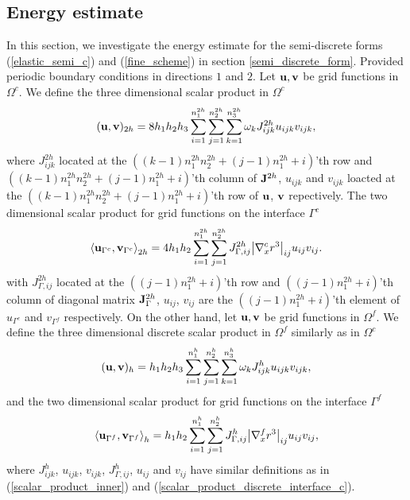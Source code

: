 \subsection{Energy estimate}
In this section, we investigate the energy estimate for the semi-discrete forms (\ref{elastic_semi_c}) and (\ref{fine_scheme}) in section \ref{semi_discrete_form}. Provided periodic boundary conditions in directions $1$ and $2$. Let ${\bf u}, {\bf v}$ be grid functions in $\Omega^c$. We define the three dimensional scalar product in $\Omega^c$
\begin{equation}\label{scalar_product_inner}
({\bf u}, {\bf v})_{2h} = 8h_1h_2h_3\sum_{i=1}^{n_1^{2h}}\sum_{j=1}^{n_2^{2h}}\sum_{k=1}^{n_3^{2h}}\omega_k{J}_{ijk}^{2h}u_{ijk}v_{ijk},
\end{equation}
where $J^{2h}_{ijk}$ located at the $((k-1)n_1^{2h}n_2^{2h}+(j-1)n_1^{2h}+i)$'th row and $((k-1)n_1^{2h}n_2^{2h}+(j-1)n_1^{2h}+i)$'th column of ${\bf J}^{2h}$, $u_{ijk}$ and $v_{ijk}$ loacted at the $((k-1)n_1^{2h}n_2^{2h}+(j-1)n_1^{2h}+i)$'th row of ${\bf u}$, ${\bf v}$ repectively. The two dimensional scalar product for grid functions on the interface $\Gamma^c$
\begin{equation}\label{scalar_product_discrete_interface_c}
\left<{\bf u}_{\Gamma^c}, {\bf v}_{\Gamma^c}\right>_{2h} = 4h_1h_2\sum_{i=1}^{n_1^{2h}}\sum_{j=1}^{n_2^{2h}}{ J}_{\Gamma,ij}^{2h}\big|\nabla_x^c r^{3}\big|_{ij}u_{ij}v_{ij}.
\end{equation}
with $J^{2h}_{\Gamma,ij}$ located at the $((j-1)n_1^{2h}+i)$'th row and $((j-1)n_1^{2h}+i)$'th column of diagonal matrix ${\bf J}_{\Gamma}^{2h}$, $u_{ij}$, $v_{ij}$ are the $((j-1)n_1^{2h}+i)$'th element of $u_{\Gamma^c}$ and $v_{\Gamma^f}$ respectively. On the other hand, let ${\bf u}, {\bf v}$ be grid functions in $\Omega^f$. We define the three dimensional discrete scalar product in $\Omega^f$ similarly as in $\Omega^c$
\begin{equation*}
({\bf u}, {\bf v})_{h} = h_1h_2h_3\sum_{i=1}^{n_1^{h}}\sum_{j=1}^{n_2^{h}}\sum_{k=1}^{n_3^{h}}\omega_k{J}_{ijk}^{h}u_{ijk}v_{ijk},
\end{equation*}
and the two dimensional scalar product for grid functions on the interface $\Gamma^f$
\begin{equation}\label{scalar_product_discrete_interface_f}
\left<{\bf u}_{\Gamma^f}, {\bf v}_{\Gamma^f}\right>_{h} = h_1h_2\sum_{i=1}^{n_1^{h}}\sum_{j=1}^{n_2^{h}}{ J}^{h}_{\Gamma,ij}\big|\nabla_x^f r^{3}\big|_{ij}u_{ij}v_{ij},
\end{equation}
where $J^h_{ijk}$, $u_{ijk}$, $v_{ijk}$, $J^h_{\Gamma,ij}$, $u_{ij}$ and $v_{ij}$ have similar definitions as in (\ref{scalar_product_inner}) and (\ref{scalar_product_discrete_interface_c}).

